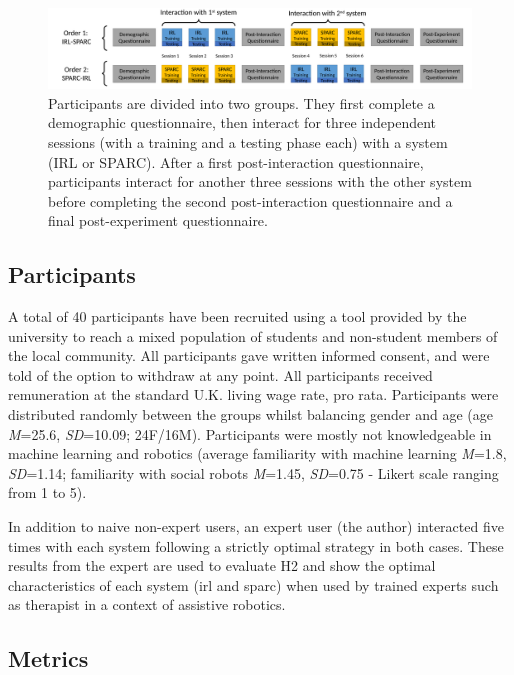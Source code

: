 \begin{figure}[t!]
	\centering
	\includegraphics[width=1\textwidth]{fullDesign.pdf}
	\caption{Participants are divided into two groups. They first complete a demographic questionnaire, then interact for three independent sessions (with a training and a testing phase each) with a system (IRL or SPARC). After a first post-interaction questionnaire, participants interact for another three sessions with the other system before completing the second post-interaction questionnaire and a final post-experiment questionnaire.}
	\label{fig:control_design}
\end{figure}

\subsection{Participants}

A total of 40 participants have been recruited using a tool provided by the university to reach a mixed population of students and non-student members of the local community.  All participants gave written informed consent, and were told of the option to withdraw at any point. All participants received remuneration at the standard U.K. living wage rate, pro rata. Participants were distributed randomly between the groups whilst balancing gender and age (age \textit{M}=25.6, \textit{SD}=10.09; 24F/16M). Participants were mostly not knowledgeable in machine learning and robotics (average familiarity with machine learning \textit{M}=1.8, \textit{SD}=1.14; familiarity with social robots \textit{M}=1.45, \textit{SD}=0.75 - Likert scale ranging from 1 to 5).

In addition to naive non-expert users, an expert user (the author) interacted five times with each system following a strictly optimal strategy in both cases. These results from the expert are used to evaluate H2 and show the optimal characteristics of each system (\gls{irl} and \gls{sparc}) when used by trained experts such as therapist in a context of assistive robotics.

\subsection{Metrics}

